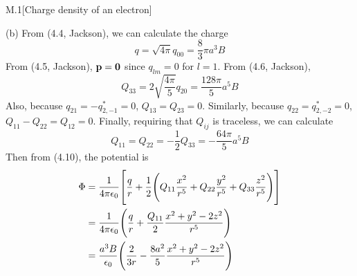 \documentclass[12pt]{article}
\begin{document}
\begin{problem}{M.1}[Charge density of an electron]
\begin{solution}
(b) From (4.4, Jackson), we can calculate the charge
\begin{equation}
    q=\sqrt{4\pi}q_{00}=\frac{8}{3}\pi a^3B
\end{equation}
From (4.5, Jackson), $\vb{p}=\bm{0}$ since $q_{lm}=0$ for $l=1$. From (4.6,
Jackson), 
\begin{equation}
    Q_{33}=2\sqrt{\frac{4\pi}{5}}q_{20}=\frac{128\pi}{5}a^5B
\end{equation}
Also, because $q_{21}=-q_{2,-1}^\ast=0$, $Q_{13}=Q_{23}=0$. Similarly, because
$q_{22}=q_{2,-2}^\ast=0$, $Q_{11}-Q_{22}=Q_{12}=0$. Finally, requiring that
$Q_{ij}$ is traceless, we can calculate
\begin{equation}
    Q_{11}=Q_{22}=-\frac12Q_{33}=-\frac{64\pi}{5}a^5B 
\end{equation}
Then from (4.10), the potential is
\begin{align}
    \Phi
    &=\frac1{4\pi\epsilon_0}\qty[\frac{q}{r}+\frac12\qty(
    Q_{11}\frac{x^2}{r^5}+Q_{22}\frac{y^2}{r^5}+Q_{33}\frac{z^2}{r^5}
    )]\notag\\
    &=\frac1{4\pi\epsilon_0}\qty(\frac{q}{r}
    +\frac{Q_{11}}{2}\frac{x^2+y^2-2z^2}{r^5})\notag\\
    &=\frac{a^3B}{\epsilon_0}\qty(\frac{2}{3r}
    -\frac{8a^2}{5}\frac{x^2+y^2-2z^2}{r^5})
\end{align}
\end{solution}
\end{problem}
\newpage
\end{document}
